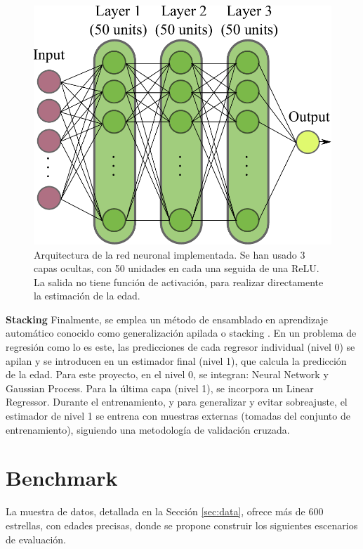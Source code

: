 \vspace{0.5cm}

\begin{figure}[H]
\begin{center}
\includegraphics[width=0.6\linewidth]{Figuras/nnet.pdf}
\end{center}
\caption{Arquitectura de la red neuronal implementada. Se han usado 3 capas ocultas, con 50 unidades en cada una seguida de una ReLU. La salida no tiene función de activación, para realizar directamente la estimación de la edad.}
\label{fig:neural_network}
\end{figure}

\textbf{Stacking} {} Finalmente, se emplea un método de ensamblado en aprendizaje automático conocido como generalización apilada o stacking \cite{Wolpert1992}. En un problema de regresión como lo es este, las predicciones de cada regresor individual (nivel 0) se apilan y se introducen en un estimador final (nivel 1), que calcula la predicción de la edad. Para este proyecto, en el nivel 0, se integran: Neural Network y Gaussian Process. Para la última capa (nivel 1), se incorpora un Linear Regressor. Durante el entrenamiento, y para generalizar y evitar sobreajuste, el estimador de nivel 1 se entrena con muestras externas (tomadas del conjunto de entrenamiento), siguiendo una metodología de validación cruzada.

\section{Benchmark}
\label{sec:benchmark}

La muestra de datos, detallada en la Sección \ref{sec:data}, ofrece más de 600 estrellas, con edades precisas, donde se propone construir los siguientes escenarios de evaluación.

\vspace{0.5cm}

